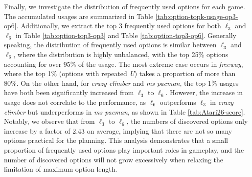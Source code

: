 Finally, we investigate the distribution of frequently used options for each game.
The accumulated usages are summarized in Table \ref{tab:option-topk-usage-op3-op6}.
Additionally, we extract the top 3 frequently used options for both $\ell_3$ and $\ell_6$ in Table \ref{tab:option-top3-op3} and Table \ref{tab:option-top3-op6}.
Generally speaking, the distribution of frequently used options is similar between $\ell_3$ and $\ell_6$, where the distribution is highly unbalanced, with the top 25\% options accounting for over 95\% of the usage.
The most extreme case occurs in \textit{freeway}, where the top 1\% (options with repeated \textit{U}) takes a proportion of more than 80\%.
On the other hand, for \textit{crazy climber} and \textit{ms pacman}, the top 1\% usages have both been significantly increased from $\ell_3$ to $\ell_6$.
However, the increase in usage does not correlate to the performance, as $\ell_6$ outperforms $\ell_3$ in \textit{crazy climber} but underperforms in \textit{ms pacman}, as shown in Table \ref{tab:Atari26-score}.
Notably, we observe that from $\ell_3$ to $\ell_6$, the numbers of discovered options only increase by a factor of 2.43 on average, implying that there are not so many options practical for the planning.
This analysis demonstrates that a small proportion of frequently used options play important roles in gameplay, and the number of discovered options will not grow excessively when relaxing the limitation of maximum option length.

